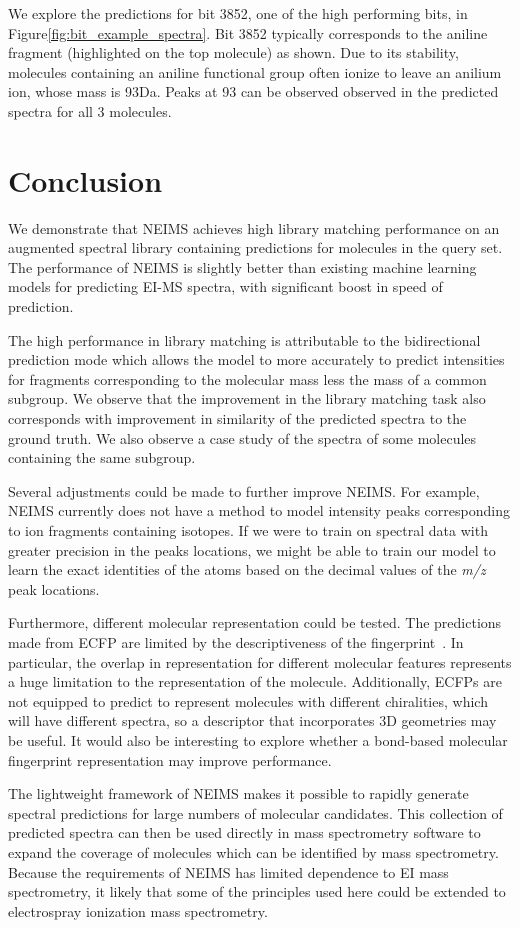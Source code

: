 \documentclass{article}
\begin{document}
We explore the predictions for bit 3852, one of the high performing bits, in Figure\ref{fig:bit_example_spectra}. Bit 3852 typically corresponds to the aniline fragment (highlighted on the top molecule) as shown. Due to its stability, molecules containing an aniline functional group often ionize to leave an anilium ion, whose mass is 93Da. Peaks at 93 can be observed observed in the predicted spectra for all 3 molecules.

\section{Conclusion}

We demonstrate that NEIMS achieves high library matching performance on an augmented spectral library containing predictions for molecules in the query set. 
The performance of NEIMS is slightly better than existing machine learning models for predicting EI-MS spectra, with significant boost in speed of prediction.

The high performance in library matching is attributable to the bidirectional prediction mode which allows the model to more accurately to predict intensities for fragments corresponding to the molecular mass less the mass of a common subgroup. We observe that the improvement in the library matching task also corresponds with improvement in similarity of the predicted spectra to the ground truth. We also observe a case study of the spectra of some molecules containing the same subgroup.

Several adjustments could be made to further improve NEIMS. For example, NEIMS currently does not have a method to model intensity peaks corresponding to ion fragments containing isotopes. If we were to train on spectral data with greater precision in the peaks locations, we might be able to train our model to learn the exact identities of the atoms based on the decimal values of the \textit{m/z} peak locations.

Furthermore, different molecular representation could be tested. The predictions made from ECFP are limited by the descriptiveness of the fingerprint~\cite{rdkit_blogpost_collide_bits}. In particular, the overlap in representation for different molecular features represents a huge limitation to the representation of the molecule. Additionally, ECFPs are not equipped to predict to represent molecules with different chiralities, which will have different spectra, so a descriptor that incorporates 3D geometries may be useful. It would also be interesting to explore whether a bond-based molecular fingerprint representation\cite{kearnes2016molecular} may improve performance.

The lightweight framework of NEIMS makes it possible to rapidly generate spectral predictions for large numbers of molecular candidates. This collection of predicted spectra can then be used directly in mass spectrometry software to expand the coverage of molecules which can be identified by mass spectrometry. Because the requirements of NEIMS has limited dependence to EI mass spectrometry, it likely that some of the principles used here could be extended to electrospray ionization mass spectrometry.



\end{document}

